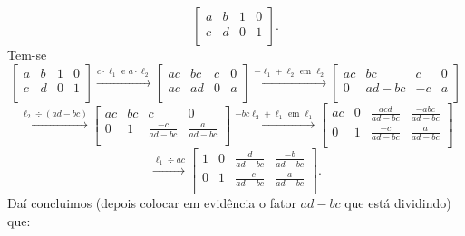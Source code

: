 \begin{equation}
\left[
\begin{array}{cc|cc}
a & b & 1 & 0 \\
c & d & 0 & 1 \\
\end{array}
\right].
\end{equation} Tem-se
\begin{equation}
\left[
\begin{array}{cc|cc}
a & b & 1 & 0 \\
c & d & 0 & 1 \\
\end{array}
\right] \xrightarrow{c\cdot \ell_1 \text{ e } a\cdot \ell_2}
\left[
\begin{array}{cc|cc}
ac & bc & c & 0 \\
ac & ad & 0 & a \\
\end{array}
\right] \xrightarrow{-\ell_1 + \ell_2 \text{ em } \ell_2}
\left[
\begin{array}{cc|cc}
ac & bc      & c  & 0 \\
0 & ad - bc & -c & a \\
\end{array}
\right]
\end{equation}
\begin{equation}
\xrightarrow{\ell_2 \div (ad-bc)}
\left[
\begin{array}{cc|cc}
ac & bc      & c  & 0 \\
0 & 1 & \frac{-c}{ad - bc} & \frac{a}{ad - bc} \\
\end{array}
\right]  \xrightarrow{-bc\ell_2 + \ell_1 \text{ em } \ell_1}
\left[
\begin{array}{cc|cc}
ac & 0 & \frac{acd}{ad - bc} & \frac{-abc}{ad - bc} \\
0 & 1 & \frac{-c}{ad - bc}  & \frac{a}{ad - bc} \\
\end{array}
\right]
\end{equation}
\begin{equation}
\xrightarrow{\ell_1 \div ac}
\left[
\begin{array}{cc|cc}
1 & 0 & \frac{ d}{ad - bc}  & \frac{-b}{ad - bc} \\
0 & 1 & \frac{-c}{ad - bc}  & \frac{ a}{ad - bc} \\
\end{array}
\right].
\end{equation} Daí concluimos (depois colocar em evidência o fator $ad - bc$ que está dividindo) que:

